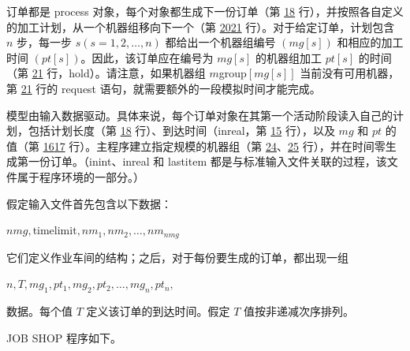 订单都是 process 对象，每个对象都生成下一份订单（第 \hyperref[pg:program-job-shop-18]{18} 行），并按照各自定义的加工计划，从一个机器组移向下一个（第 \hyperref[pg:program-job-shop-20]{20}\textendash \hyperref[pg:program-job-shop-21]{21} 行）。对于给定订单，计划包含 $n$ 步，每一步 $s(s = 1, 2, \dots, n)$ 都给出一个机器组编号 $(mg[s])$ 和相应的加工时间 $(pt[s])$。因此，该订单应在编号为 $mg[s]$ 的机器组加工 $pt[s]$ 的时间（第 \hyperref[pg:program-job-shop-21]{21} 行，hold）。请注意，如果机器组 $m$group$[mg[s]]$ 当前没有可用机器，第 \hyperref[pg:program-job-shop-21]{21} 行的 request 语句，就需要额外的一段模拟时间才能完成。

模型由输入数据驱动。具体来说，每个订单对象在其第一个活动阶段读入自己的计划，包括计划长度（第 \hyperref[pg:program-job-shop-18]{18} 行）、到达时间（inreal，第 \hyperref[pg:program-job-shop-15]{15} 行），以及 $mg$ 和 $pt$ 的值（第 \hyperref[pg:program-job-shop-16]{16}\textendash\hyperref[pg:program-job-shop-17]{17} 行）。主程序建立指定规模的机器组（第 \hyperref[pg:program-job-shop-24]{24}、\hyperref[pg:program-job-shop-25]{25} 行），并在时间零生成第一份订单。（inint、inreal 和 lastitem 都是与标准输入文件关联的过程，该文件属于程序环境的一部分。）

假定输入文件首先包含以下数据：

\quad $nmg, \text{timelimit}, nm_1, nm_2, \dots, nm_{nmg}$

\noindent
它们定义作业车间的结构；之后，对于每份要生成的订单，都出现一组

\quad $n, T, mg_1, pt_1, mg_2, pt_2, \dots, mg_n, pt_n,$

\noindent
数据。每个值 $T$ 定义该订单的到达时间。假定 $T$ 值按非递减次序排列。

JOB SHOP 程序如下。

